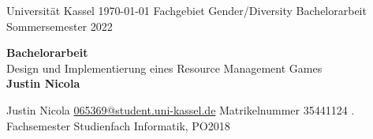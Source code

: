 \thispagestyle{empty}

\begin{flushleft}
	Universität Kassel \hfill \today \linebreak
	Fachgebiet Gender/Diversity \linebreak
	Bachelorarbeit \linebreak
	Sommersemester 2022 \linebreak
\end{flushleft}

\vfill

\begin{center}
	{\Huge \bfseries Bachelorarbeit} \\[12pt]
	{\huge Design und Implementierung eines Resource Management Games} \\[24pt]
	{\Large \bfseries Justin Nicola}
\end{center}

\vfill
\vfill

\begin{flushleft}
	Justin Nicola \linebreak
	\href{mailto:065369@student.uni-kassel.de}{065369@student.uni-kassel.de} \linebreak
	Matrikelnummer 35441124 . Fachsemester \linebreak
	Studienfach Informatik, PO2018
\end{flushleft}

